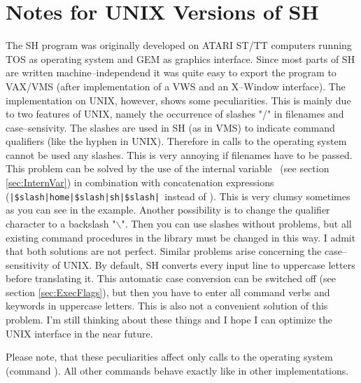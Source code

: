 \section{Notes for UNIX Versions of SH}

The SH program was originally developed on ATARI ST/TT computers
running TOS as operating system and GEM as graphics interface.
Since most parts of SH are written machine--independend it was quite
easy to export the program to VAX/VMS (after implementation of
a VWS and an X--Window interface).  The implementation on UNIX,
however, shows some peculiarities.  This is mainly due to two
features of UNIX, namely the occurrence of slashes "/" in filenames
and case--sensivity.  The slashes are used in SH (as in VMS) to
indicate command qualifiers (like the hyphen in UNIX).  Therefore
in calls to the operating system cannot be used any slashes.
This is very annoying if filenames have to be passed.  This
problem can be solved by the use of the internal variable
\ (see section \ref{sec:InternVar}) in combination
with concatenation expressions (\verb'|$slash|home|$slash|sh|$slash|'\
instead of ).  This is very clumsy sometimes as you
can see in the example.  Another possibility is to change the
qualifier character to a backslash "$\backslash$".  Then you can
use slashes without problems, but all existing command procedures
in the library must be changed in this way.  I admit that both
solutions are not perfect.
Similar problems arise concerning the case--sensitivity of UNIX.
By default, SH converts every input line to uppercase letters
before translating it.  This automatic case conversion can be
switched off (see section \ref{sec:ExecFlags}), but then you have
to enter all command verbs and keywords in uppercase letters.
This is also not a convenient solution of this problem.  I'm
still thinking about these things and I hope I can optimize the
UNIX interface in the near future.

Please note, that these peculiarities affect only calls to the
operating system (command ).  All other commands
behave exactly like in other implementations.



%
%
%
%


